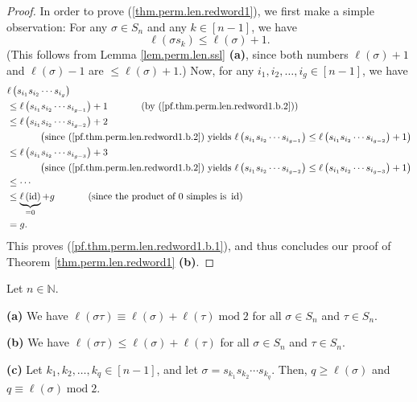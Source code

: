 \begin{proof}
In order to prove (\ref{thm.perm.len.redword1}), we first make a simple
observation: For any $\sigma\in S_{n}$ and any $k\in\left[  n-1\right]  $, we
have%
\begin{equation}
\ell\left(  \sigma s_{k}\right)  \leq\ell\left(  \sigma\right)  +1.
\label{pf.thm.perm.len.redword1.b.2}%
\end{equation}
(This follows from Lemma \ref{lem.perm.len.ssl} \textbf{(a)}, since both
numbers $\ell\left(  \sigma\right)  +1$ and $\ell\left(  \sigma\right)  -1$
are $\leq\ell\left(  \sigma\right)  +1$.) Now, for any $i_{1},i_{2}%
,\ldots,i_{g}\in\left[  n-1\right]  $, we have%
\begin{align*}
&  \ell\left(  s_{i_{1}}s_{i_{2}}\cdots s_{i_{g}}\right) \\
&  \leq\ell\left(  s_{i_{1}}s_{i_{2}}\cdots s_{i_{g-1}}\right)
+1\ \ \ \ \ \ \ \ \ \ \left(  \text{by (\ref{pf.thm.perm.len.redword1.b.2}%
)}\right) \\
&  \leq\ell\left(  s_{i_{1}}s_{i_{2}}\cdots s_{i_{g-2}}\right)  +2\\
&  \ \ \ \ \ \ \ \ \ \ \left(  \text{since (\ref{pf.thm.perm.len.redword1.b.2}%
) yields }\ell\left(  s_{i_{1}}s_{i_{2}}\cdots s_{i_{g-1}}\right)  \leq
\ell\left(  s_{i_{1}}s_{i_{2}}\cdots s_{i_{g-2}}\right)  +1\right) \\
&  \leq\ell\left(  s_{i_{1}}s_{i_{2}}\cdots s_{i_{g-3}}\right)  +3\\
&  \ \ \ \ \ \ \ \ \ \ \left(  \text{since (\ref{pf.thm.perm.len.redword1.b.2}%
) yields }\ell\left(  s_{i_{1}}s_{i_{2}}\cdots s_{i_{g-2}}\right)  \leq
\ell\left(  s_{i_{1}}s_{i_{2}}\cdots s_{i_{g-3}}\right)  +1\right) \\
&  \leq\cdots\\
&  \leq\underbrace{\ell\left(  \operatorname*{id}\right)  }_{=0}%
+g\ \ \ \ \ \ \ \ \ \ \left(  \text{since the product of }0\text{ simples is
}\operatorname*{id}\right) \\
&  =g.
\end{align*}
This proves (\ref{pf.thm.perm.len.redword1.b.1}), and thus concludes our proof
of Theorem \ref{thm.perm.len.redword1} \textbf{(b)}.
\end{proof}

\begin{corollary}
\label{cor.perm.red.sigtau}Let $n\in\mathbb{N}$. \medskip

\textbf{(a)} We have $\ell\left(  \sigma\tau\right)  \equiv\ell\left(
\sigma\right)  +\ell\left(  \tau\right)  \operatorname{mod}2$ for all
$\sigma\in S_{n}$ and $\tau\in S_{n}$. \medskip

\textbf{(b)} We have $\ell\left(  \sigma\tau\right)  \leq\ell\left(
\sigma\right)  +\ell\left(  \tau\right)  $ for all $\sigma\in S_{n}$ and
$\tau\in S_{n}$. \medskip

\textbf{(c)} Let $k_{1},k_{2},\ldots,k_{q}\in\left[  n-1\right]  $, and let
$\sigma=s_{k_{1}}s_{k_{2}}\cdots s_{k_{q}}$. Then, $q\geq\ell\left(
\sigma\right)  $ and $q\equiv\ell\left(  \sigma\right)  \operatorname{mod}2$.
\end{corollary}

